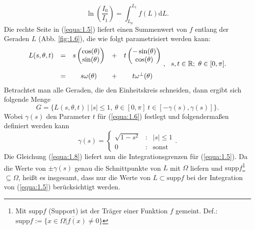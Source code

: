 \begin{equation}
	\ln(\frac{I_0}{I_1}) = \int_{L_0}^{L_1} f(L) \mbox{d} L.
	\label{equa:1.5}
\end{equation} 
Die rechte Seite in (\ref{equa:1.5}) liefert einen Summenwert von $f$ entlang der Geraden $L$ (Abb. \ref{fig:1.6}), die wie folgt parametrisiert werden kann:
\begin{equation}
	\begin{matrix}
		L(s, \theta, t) & = & s\begin{pmatrix} \cos(\theta) \\ \sin(\theta) \end{pmatrix} & + & t\begin{pmatrix} -\sin(\theta) \\ \cos(\theta)  \end{pmatrix} \\ \\
		& = & s\omega(\theta) & + & t\omega^{\perp}(\theta)
	\end{matrix} \ , \ \ s, t \in \mathbb{R}; \ \theta \in [0,\pi].
	\label{equa:1.6}
\end{equation}
Betrachtet man alle Geraden, die den Einheitskreis schneiden, dann ergibt sich folgende Menge
\begin{equation}
	G = \{ L(s, \theta, t) \ | \ |s| \leq 1, \  \theta \in [0,\pi] \ t \in [-\gamma(s), \gamma(s)] \}.
	\label{equa:1.7}
\end{equation}
Wobei $\gamma(s)$ den Parameter $t$ für (\ref{equa:1.6}) festlegt und folgendermaßen definiert werden kann
\begin{equation}
	\gamma(s) = \left\{ \begin{matrix}
	\sqrt{1 - s^2} & : & |s| \leq 1 \\ 
	0 & : & \mbox{sonst}
	\end{matrix}.
	\right.
	\label{equa:1.8}
\end{equation}
Die Gleichung (\ref{equa:1.8}) liefert nun die Integrationsgrenzen für (\ref{equa:1.5}). Da die Werte von $\pm\gamma(s)$ genau die Schnittpunkte von $L$ mit $\Omega$ liefern und  $\mbox{supp} f$\footnote{\label{foot:3} Mit $\mbox{supp} f$ (Support) ist der Träger einer Funktion $f$ gemeint. Def.: $\mbox{supp} f := \overline{ \{ x \in \Omega | f(x) \neq 0 \} } $} $\subseteq \Omega$, heißt es insgesamt, dass nur die Werte von $L \subset \mbox{supp} f$ bei der Integration von (\ref{equa:1.5}) berücksichtigt werden.

